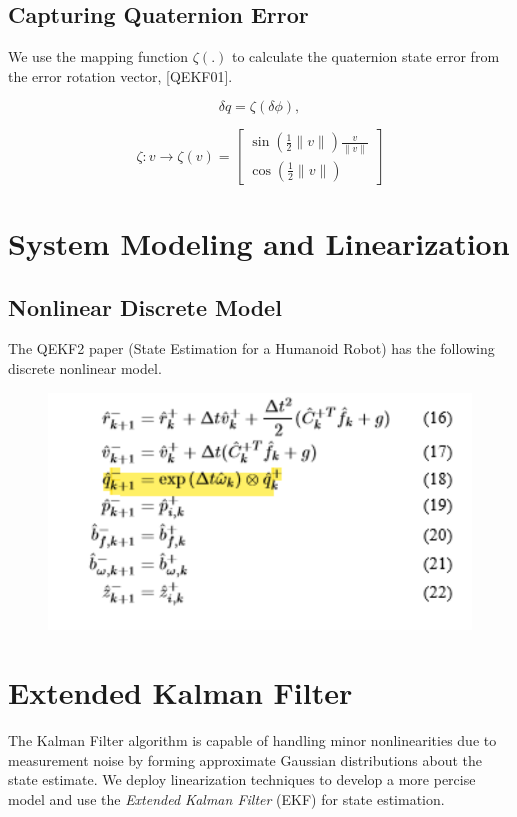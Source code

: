 \documentclass[letterpaper, 10 pt, conference]{ieeeconf}  %
\begin{document}
\subsection{Capturing Quaternion Error}
We use the mapping function $\zeta(.)$ to calculate the quaternion
state error from the error rotation vector, [QEKF01].

\begin{equation}
\label{eq:16}
\delta q = \zeta(\delta \phi),
\end{equation}

\begin{equation}
\label{eq:17}
\zeta : v \rightarrow \zeta(v) =
        \begin{bmatrix}
        \sin(\frac{1}{2}\|v\|) \frac{v}{\|v\|} \\
        \cos(\frac{1}{2}\|v\|)
        \end{bmatrix}
\end{equation}

\section{System Modeling and Linearization}

\subsection{Nonlinear Discrete Model}
The QEKF2 paper (State Estimation for a Humanoid Robot) has the following discrete
nonlinear model.

\begin{figure}[h]
  \includegraphics[width=.45\textwidth]{fig01.png}
  \centering
\end{figure}




\section{Extended Kalman Filter}
The Kalman Filter algorithm is capable of handling minor nonlinearities due to measurement
noise by forming approximate Gaussian distributions about the state estimate.
We deploy linearization techniques to develop a more percise model and use the
\textit{Extended Kalman Filter} (EKF) for state estimation.
\end{document}
